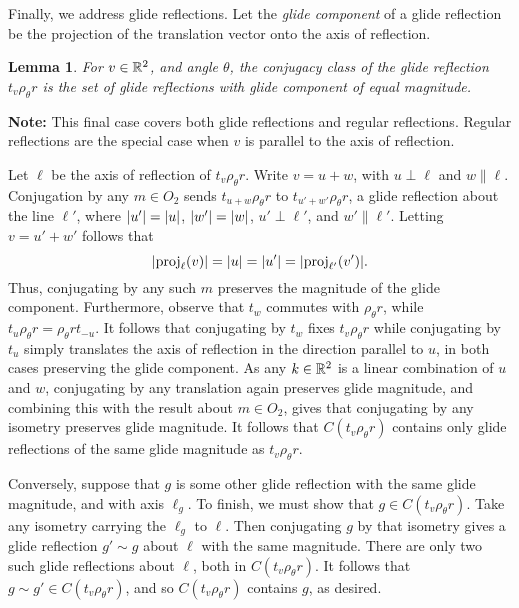\documentclass{scrartcl}
\newcommand{\cbold}[1]{{#1}}
\newtheorem{lemma}{Lemma}
\begin{document}
\begin{solution}
    Finally, we address \cbold{glide reflections}. Let the \textit{glide component} of a glide reflection be the projection of the translation vector onto the axis of reflection.
    \begin{lemma}
    For $v\in \mathbb R^2$, and angle $\theta$, the conjugacy class of the glide reflection $t_v\rho_\theta r$ is the set of glide reflections with glide component of equal magnitude.
    \end{lemma}
    \textbf{Note:} This final case covers both glide reflections and regular reflections. Regular reflections are the special case when $v$ is parallel to the axis of reflection.
    \begin{tproof}
    Let $\ell$ be the axis of reflection of $t_v\rho_\theta r$. Write $v=u+w$, with $u\perp \ell$ and $w\parallel \ell$. Conjugation by any $m\in O_2$ sends $t_{u+w}\rho_\theta r$ to $t_{u'+w'}\rho_\theta r$, a glide reflection about the line $\ell'$, where $\lvert u'\rvert=\lvert u\rvert$, $\lvert w'\rvert=\lvert w\rvert$, $u'\perp \ell'$, and $w'\parallel \ell'$. Letting $v=u'+w'$ follows that
    \[\lvert\operatorname{proj}_\ell(v)\rvert=\lvert u\rvert=\lvert u'\rvert=\lvert\operatorname{proj}_{\ell'}(v')\rvert.\] Thus, conjugating by any such $m$ preserves the magnitude of the glide component. Furthermore, observe that $t_w$ commutes with $\rho_\theta r$, while $t_u\rho_\theta r=\rho_\theta rt_{-u}$. It follows that conjugating by $t_w$ fixes $t_v\rho_\theta r$ while conjugating by $t_u$ simply translates the axis of reflection in the direction parallel to $u$, in both cases preserving the glide component. As any $k\in \mathbb R^2$ is a linear combination of $u$ and $w$, conjugating by any translation again preserves glide magnitude, and combining this with the result about $m\in O_2$, gives that conjugating by any isometry preserves glide magnitude. It follows that $C(t_v\rho_\theta r)$ contains only glide reflections of the same glide magnitude as $t_v\rho_\theta r$.
    
    Conversely, suppose that $g$ is some other glide reflection with the same glide magnitude, and with axis $\ell_g$. To finish, we must show that $g\in C(t_v\rho_\theta r)$. Take any isometry carrying the $\ell_g$ to $\ell$. Then conjugating $g$ by that isometry gives a glide reflection $g'\sim g$ about $\ell$ with the same magnitude. There are only two such glide reflections about $\ell$, both in $C(t_v\rho_\theta r)$. It follows that $g\sim g'\in C(t_v\rho_\theta r)$, and so $C(t_v\rho_\theta r)$ contains $g$, as desired.
    \end{tproof}


\end{solution}
\end{document}
